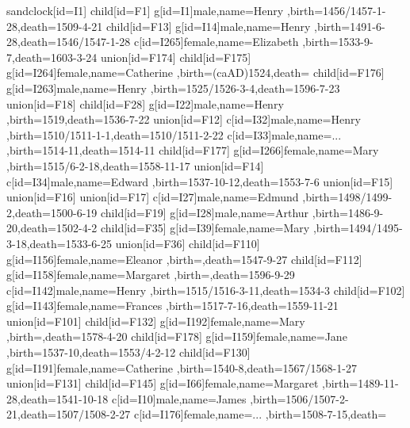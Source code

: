 sandclock[id=I1]{
	child[id=F1]{
		g[id=I1]{male,name={Henry },birth={1456/1457-1-28}{},death={1509-4-21}{}}
		child[id=F13]{
			g[id=I14]{male,name={Henry },birth={1491-6-28}{},death={1546/1547-1-28}{}}
			c[id=I265]{female,name={Elizabeth },birth={1533-9-7}{},death={1603-3-24}{}}
			union[id=F174]{
				child[id=F175]{
					g[id=I264]{female,name={Catherine },birth={(caAD)1524}{},death={}{}}
				}
				child[id=F176]{
					g[id=I263]{male,name={Henry },birth={1525/1526-3-4}{},death={1596-7-23}{}}
				}
			}
			union[id=F18]{
				child[id=F28]{
					g[id=I22]{male,name={Henry },birth={1519}{},death={1536-7-22}{}}
				}
			}
			union[id=F12]{
				c[id=I32]{male,name={Henry },birth={1510/1511-1-1}{},death={1510/1511-2-22}{}}
				c[id=I33]{male,name={... },birth={1514-11}{},death={1514-11}{}}
				child[id=F177]{
					g[id=I266]{female,name={Mary },birth={1515/6-2-18}{},death={1558-11-17}{}}
				}
			}
			union[id=F14]{
				c[id=I34]{male,name={Edward },birth={1537-10-12}{},death={1553-7-6}{}}
			}
			union[id=F15]{
			}
			union[id=F16]{
			}
			union[id=F17]{
			}
		}
		c[id=I27]{male,name={Edmund },birth={1498/1499-2}{},death={1500-6-19}{}}
		child[id=F19]{
			g[id=I28]{male,name={Arthur },birth={1486-9-20}{},death={1502-4-2}{}}
		}
		child[id=F35]{
			g[id=I39]{female,name={Mary },birth={1494/1495-3-18}{},death={1533-6-25}{}}
			union[id=F36]{
				child[id=F110]{
					g[id=I156]{female,name={Eleanor },birth={}{},death={1547-9-27}{}}
					child[id=F112]{
						g[id=I158]{female,name={Margaret },birth={}{},death={1596-9-29}{}}
					}
				}
				c[id=I142]{male,name={Henry },birth={1515/1516-3-11}{},death={1534-3}{}}
				child[id=F102]{
					g[id=I143]{female,name={Frances },birth={1517-7-16}{},death={1559-11-21}{}}
					union[id=F101]{
						child[id=F132]{
							g[id=I192]{female,name={Mary },birth={}{},death={1578-4-20}{}}
						}
						child[id=F178]{
							g[id=I159]{female,name={Jane },birth={1537-10}{},death={1553/4-2-12}{}}
						}
						child[id=F130]{
							g[id=I191]{female,name={Catherine },birth={1540-8}{},death={1567/1568-1-27}{}}
							union[id=F131]{
							}
						}
					}
				}
			}
		}
		child[id=F145]{
			g[id=I66]{female,name={Margaret },birth={1489-11-28}{},death={1541-10-18}{}}
			c[id=I10]{male,name={James },birth={1506/1507-2-21}{},death={1507/1508-2-27}{}}
			c[id=I176]{female,name={... },birth={1508-7-15}{},death={}{}}
}}}
